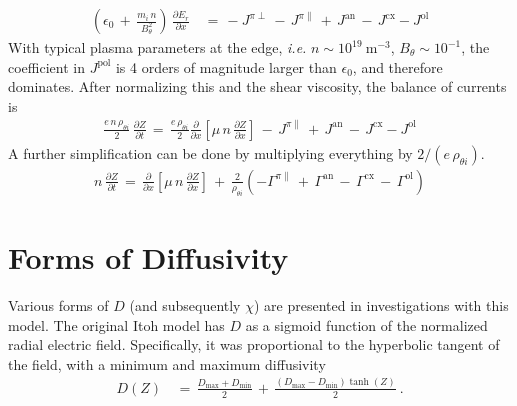 \begin{align} %
	\left(\epsilon_0 \,+\, \frac{m_i \, n}{B_\theta^2}\right) \,
	\frac{\partial E_r}{\partial x} \,&=\, -J^{\pi\perp} \,-\, J^{\pi\parallel}
		\,+\, J^\text{an} \,-\, J^\text{cx} - J^\text{ol}
\end{align}
With typical plasma parameters at the edge, \emph{i.e.} $n \sim 10^{19}~\text{m}^{-3}$, $B_\theta \sim 10^{-1}$, the coefficient in $J^\text{pol}$ is 4 orders of magnitude larger than $\epsilon_0$, and therefore dominates.
After normalizing this and the shear viscosity, the balance of currents is
\begin{align} %
	\frac{e \, n \, \rho_{\theta i}}{2} \, \frac{\partial Z}{\partial t}
		\,=\, \frac{e \, \rho_{\theta i}}{2} \frac{\partial}{\partial x}
		\left[\mu \, n \, \frac{\partial Z}{\partial x}\right] \,-\,
		J^{\pi\parallel} \,+\, J^\text{an} \,-\, J^\text{cx} - J^\text{ol}
		\label{eq:normalized_Z_equation}
\end{align}
A further simplification can be done by multiplying everything by $2 / (e \, \rho_{\theta i})$.
\begin{align} %
	n \, \frac{\partial Z}{\partial t} \,=\, \frac{\partial}{\partial x}
		\left[\mu \, n \, \frac{\partial Z}{\partial x}\right] \,+\,
		\frac{2}{\rho_{\theta i}} \left(-\Gamma^{\pi\parallel} \,+\,
		\Gamma^\text{an} \,-\, \Gamma^\text{cx} \,-\, \Gamma^\text{ol}\right)
		\label{eq:reduced_normalized_Z_equation}
\end{align}

\section{Forms of Diffusivity}\label{sec:diffusivity}
Various forms of $D$ (and subsequently $\chi$) are presented in investigations with this model.
The original Itoh model has $D$ as a sigmoid function of the normalized radial electric field.
Specifically, it was proportional to the hyperbolic tangent of the field, with a minimum and maximum diffusivity \cite{itoh_edge_1991, zohm_dynamic_1994}
\begin{align} %
	D(Z) \,&=\, \frac{D_\text{max} + D_\text{min}}{2} \,+\,
		\frac{(D_\text{max} - D_\text{min})\tanh(Z)}{2}~.
		\label{eq:Itoh_diffusivity}
\end{align}

